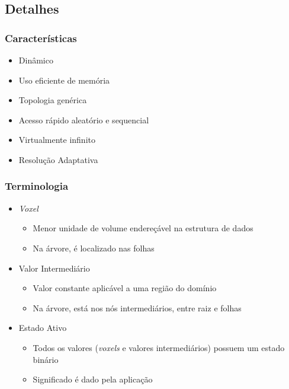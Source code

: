 \documentclass{beamer}
\begin{document}
\subsection{Detalhes}
\begin{frame}

\frametitle{Características}

\begin{itemize}
\item Dinâmico
\item Uso eficiente de memória
\item Topologia genérica
\item Acesso rápido aleatório e sequencial
\item Virtualmente infinito
\item Resolução Adaptativa
\end{itemize}

\end{frame}


\begin{frame}

\frametitle{Terminologia}

\begin{itemize}
\item \emph{Voxel}
\begin{itemize}
\item Menor unidade de volume endereçável na estrutura de dados
\item Na árvore, é localizado nas folhas
\end{itemize}
\item Valor Intermediário
\begin{itemize}
\item Valor constante aplicável a uma região do domínio
\item Na árvore, está nos nós intermediários, entre raiz e folhas
\end{itemize}
\item Estado Ativo
\begin{itemize}
\item Todos os valores (\emph{voxels} e valores intermediários) possuem um estado binário
\item Significado é dado pela aplicação
\end{itemize}
\end{itemize}

\end{frame}
\end{document}
